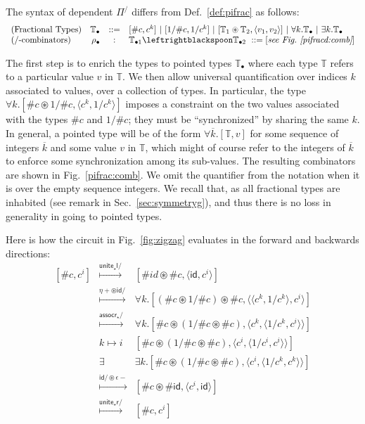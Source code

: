 \documentclass[a4paper,USenglish]{lipics-v2016-utf8x}
\newcommand{\hash}{\#}
\newcommand{\alt}{~|~}
\newcommand{\order}[1]{\hash #1}
\newcommand{\iorder}[1]{1/\hash #1}
\newcommand{\synch}{\mathsf{{synch}}}
\newcommand{\unitetl}{\mathsf{{unite_{\star}l}}}
\newcommand{\unitetr}{\mathsf{{unite_{\star}r}}}
\newcommand{\assocrt}{\mathsf{{assocr_{\star}}}}
\newcommand{\idiso}{\mathsf{{id}}}
\begin{document}
\begin{definition}[Dependent $\Pi^/$]
\label{def:pifracd}
The syntax of dependent $\Pi^/$ differs from Def.~\ref{def:pifrac} as follows:
\[\begin{array}{lrcl}
(\textrm{Fractional Types}) & \mathbb{T_\bullet} &::=&
  [\order{c},c^k] \alt
  [\iorder{c},1/c^k] \alt
  [\mathbb{T}_1 \circledast \mathbb{T}_2,\langle v_1,v_2 \rangle] \alt
  \forall k.\mathbb{T_\bullet} \alt \exists k.\mathbb{T_\bullet} \\
 (\textrm{/-combinators}) & \rho_\bullet &:&
  \mathbb{T}_{\bullet 1} \leftrightblackspoon \mathbb{T}_{\bullet 2} ~::=
  [\textit{see Fig.~\ref{pifracd:comb}}]
\end{array}\]
\end{definition}

The first step is to enrich the types to pointed types $\mathbb{T_\bullet}$
where each type $\mathbb{T}$ refers to a particular value $v$ in
$\mathbb{T}$. We then allow universal quantification over indices $k$
associated to values, over a collection of types.
In particular, the type
$\forall k.[\order{c} \circledast \iorder{c}, \langle c^k, 1/c^k \rangle]$
imposes a constraint on the two values associated with the types $\order{c}$ and
$\iorder{c}$; they must be ``synchronized'' by sharing the same $k$. In
general, a pointed type will be of the form
$\forall\overline{k}.[\mathbb{T},v]$ for some sequence of integers
$\overline{k}$ and some value $v$ in $\mathbb{T}$, which might of course refer
to the integers of $\overline{k}$ to enforce some synchronization among its
sub-values.  The resulting combinators are shown in Fig.~\ref{pifrac:comb}.
We omit the quantifier from the notation when it is over the empty sequence
integers.  We recall that, as all fractional types are inhabited (see remark in
Sec.~\ref{sec:symmetryg}), and thus there is no loss in generality in going to
pointed types.

Here is how the circuit in Fig.~\ref{fig:zigzag} evaluates in the forward and
backwards directions:
\[\begin{array}{rcl}
[\order{c},c^i]
&\stackrel{\unitetl/}{\longmapsto}&
  [\order{id}\circledast\order{c}, \langle \idiso,c^i \rangle] \\
&\stackrel{\eta+\circledast\idiso/}{\longmapsto}&
  \forall{k}.[(\order{c}\circledast\iorder{c})\circledast\order{c},
  \langle \langle c^k,1/c^k \rangle,c^i \rangle] \\
&\stackrel{\assocrt/}{\longmapsto}&
  \forall{k}.[\order{c}\circledast(\iorder{c}\circledast\order{c}),
  \langle c^k, \langle 1/c^k,c^i \rangle\rangle] \\
&k\mapsto i&
  [\order{c}\circledast(\iorder{c}\circledast\order{c}),
  \langle c^i, \langle 1/c^i,c^i \rangle\rangle] \\
&\exists&
  \exists{k}.[\order{c}\circledast(\iorder{c}\circledast\order{c}),
  \langle c^i, \langle 1/c^k,c^k \rangle\rangle] \\
&\stackrel{\idiso/\circledast\epsilon-}{\longmapsto}&
  [\order{c}\circledast\order{\idiso},
  \langle c^i, \idiso \rangle] \\
&\stackrel{\unitetr/}{\longmapsto}&
  [\order{c}, c^i]
\end{array}\]
\end{document}
